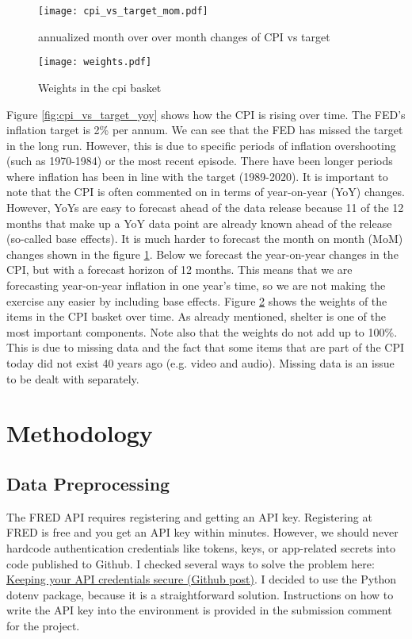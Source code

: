 \documentclass[12pt]{article}
\begin{document}
\begin{figure}[h]
    \centering
    \texttt{[image: cpi\_vs\_target\_mom.pdf]}
    \caption{annualized month over over month changes of CPI vs target}
    \label{fig:cpi_vs_target_mom}
\end{figure}

\begin{figure}[h]
    \centering
    \texttt{[image: weights.pdf]}
    \caption{Weights in the cpi basket}
    \label{fig:weights}
\end{figure}

Figure \ref{fig:cpi_vs_target_yoy} shows how the CPI is rising over time. The FED's inflation target is 2\% per annum. We can see that the FED has missed the target in the long run. However, this is due to specific periods of inflation overshooting (such as 1970-1984) or the most recent episode. There have been longer periods where inflation has been in line with the target (1989-2020). It is important to note that the CPI is often commented on in terms of year-on-year (YoY) changes. However, YoYs are easy to forecast ahead of the data release because 11 of the 12 months that make up a YoY data point are already known ahead of the release (so-called base effects). It is much harder to forecast the month on month (MoM) changes shown in the figure \ref{fig:cpi_vs_target_mom}. Below we forecast the year-on-year changes in the CPI, but with a forecast horizon of 12 months. This means that we are forecasting year-on-year inflation in one year's time, so we are not making the exercise any easier by including base effects. 
Figure \ref{fig:weights} shows the weights of the items in the CPI basket over time. As already mentioned, shelter is one of the most important components. Note also that the weights do not add up to 100\%. This is due to missing data and the fact that some items that are part of the CPI today did not exist 40 years ago (e.g. video and audio). Missing data is an issue to be dealt with separately.


\section{Methodology}
\subsection{Data Preprocessing}

The FRED API requires registering and getting an API key. Registering at FRED is free and you get an API key within minutes. However, we should never hardcode authentication credentials like tokens, keys, or app-related secrets into code published to Github.  
I checked several ways to solve the problem here: \href{https://docs.github.com/en/rest/overview/keeping-your-api-credentials-secure?apiVersion=2022-11-28}{Keeping your API credentials secure (Github post)}. I decided to use the Python dotenv package, because it is a straightforward solution. Instructions on how to write the API key into the environment is provided in the submission comment for the project. 
\end{document}
